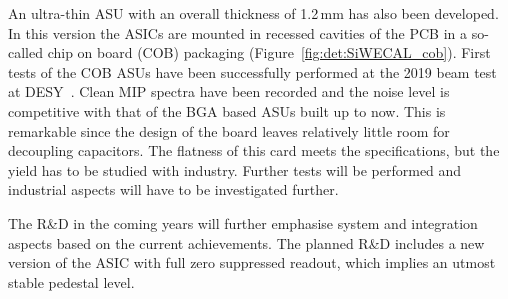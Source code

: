 An ultra-thin ASU with an overall thickness of 1.2\,mm has also been developed. In this version the ASICs are mounted in recessed cavities of the PCB in a so-called chip on board (COB) packaging (Figure~\ref{fig:det:SiWECAL_cob}). 
 First tests of the COB ASUs have been successfully performed at the 2019 beam test at DESY~\cite{bib:talk-twepp-jj}. Clean MIP spectra have been recorded and the noise level is competitive with that of the BGA based ASUs built up to now. This is remarkable since the design of the board leaves relatively little room for decoupling capacitors. The flatness of this card  meets the specifications, but the yield has to be studied with industry. Further tests will be performed and industrial aspects will  have to be investigated further.



The R\&D in the coming years will further emphasise system and integration aspects based on the current achievements. The planned R\&D includes a new version of the  ASIC with full zero suppressed readout, which implies an utmost stable pedestal level.


